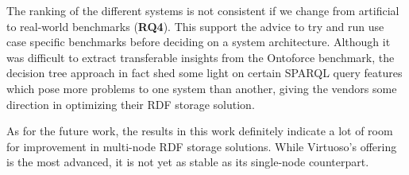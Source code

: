 The ranking of the different systems is not consistent if we change from artificial to real-world benchmarks (\textbf{RQ4}). This support the advice to try and run use case specific benchmarks before deciding on a system architecture. Although it was difficult to extract transferable insights from the Ontoforce benchmark, the decision tree approach in fact shed some light on certain SPARQL query features which pose more problems to one system than another, giving the vendors some direction in optimizing their RDF storage solution.

As for the future work, the results in this work definitely indicate a lot of room for improvement in multi-node RDF storage solutions. While Virtuoso's offering is the most advanced, it is not yet as stable as its single-node counterpart. 


%


